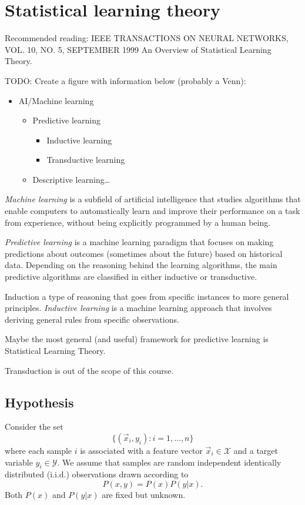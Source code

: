 \chapter{Statistical learning theory}

Recommended reading: IEEE TRANSACTIONS ON NEURAL NETWORKS, VOL. 10, NO. 5, SEPTEMBER 1999
An Overview of Statistical Learning Theory.

TODO: Create a figure with information below (probably a Venn):
\begin{itemize}
  \item AI/Machine learning
  \begin{itemize}
    \item Predictive learning
    \begin{itemize}
      \item Inductive learning
      \item Transductive learning
    \end{itemize}
    \item Descriptive learning\dots
  \end{itemize}
\end{itemize}

\emph{Machine learning} is a subfield of artificial intelligence that studies algorithms
that enable computers to automatically learn and improve their performance on a task from
experience, without being explicitly programmed by a human being.

\emph{Predictive learning} is a machine learning paradigm that focuses on making
predictions about outcomes (sometimes about the future) based on historical data.
Depending on the reasoning behind the learning algorithms, the main predictive algorithms
are classified in either inductive or transductive.

Induction a type of reasoning that goes from specific instances to more general
principles. \emph{Inductive learning} is a machine learning approach that involves deriving
general rules from specific observations.

Maybe the most general (and useful) framework for predictive learning is Statistical
Learning Theory.

Transduction is out of the scope of this course.

\section{Hypothesis}

Consider the set
\begin{equation}
  \label{eq:training-set}
  \big\{(\vec{x}_i, y_i) : i = 1, \dots, n \big\}
\end{equation}
where each sample $i$ is associated with a feature vector $\vec{x}_i \in \mathcal{X}$ and a target variable
$y_i \in \mathcal{Y}$.  We assume that samples are random independent identically
distributed (i.i.d.) observations drawn according to $$P(x, y) = P(x) P(y | x)\text{.}$$
Both $P(x)$ and $P(y|x)$ are fixed but unknown.

